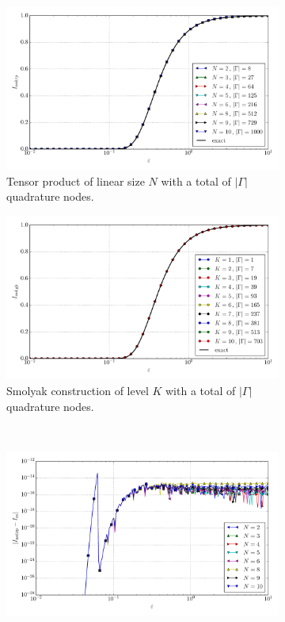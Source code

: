 \documentclass[a4paper,10pt]{article}
\begin{document}
\begin{figure}[ht!]
  \begin{subfigure}[t]{0.5\linewidth}
    \includegraphics[width=\linewidth]{./plots/tp_sg_3d_conv_eps_(0,0,0)_(0,0,0)_val_nsd_tp.pdf}
    \caption{Tensor product of linear size $N$ with a total of $|\Gamma|$ quadrature nodes.}
    \label{fig:tp_sg_3d_conv_p_000_000_val_nsd_tp}
  \end{subfigure}
  \begin{subfigure}[t]{0.5\linewidth}
    \includegraphics[width=\linewidth]{./plots/tp_sg_3d_conv_eps_(0,0,0)_(0,0,0)_val_nsd_gk.pdf}
    \caption{Smolyak construction of level $K$ with a total of $|\Gamma|$ quadrature nodes.}
    \label{fig:tp_sg_3d_conv_p_000_000_val_nsd_gk}
  \end{subfigure} \\
  \begin{subfigure}[t]{0.5\linewidth}
    \includegraphics[width=\linewidth]{./plots/tp_sg_3d_conv_eps_(0,0,0)_(0,0,0)_err_nsd_tp.pdf}

\end{subfigure}
\end{figure}
\end{document}
